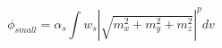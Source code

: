 \begin{equation}
    \phi_{small} = \alpha_s \int w_s\left|\sqrt{m_x^2+m_y^2+m_z^2}\right|^p dv
\end{equation}

